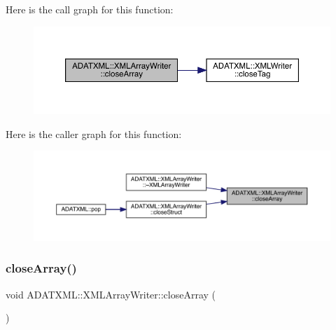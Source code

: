 Here is the call graph for this function\+:
\nopagebreak
\begin{figure}[H]
\begin{center}
\leavevmode
\includegraphics[width=350pt]{dc/df3/classADATXML_1_1XMLArrayWriter_a5d6b79a0e8add658220f21e5fc138230_cgraph}
\end{center}
\end{figure}
Here is the caller graph for this function\+:
\nopagebreak
\begin{figure}[H]
\begin{center}
\leavevmode
\includegraphics[width=350pt]{dc/df3/classADATXML_1_1XMLArrayWriter_a5d6b79a0e8add658220f21e5fc138230_icgraph}
\end{center}
\end{figure}
\mbox{\label{classADATXML_1_1XMLArrayWriter_a5d6b79a0e8add658220f21e5fc138230}} 
\subsubsection{\texorpdfstring{closeArray()}{closeArray()}\hspace{0.1cm}{\footnotesize\ttfamily [2/3]}}
{\footnotesize\ttfamily void A\+D\+A\+T\+X\+M\+L\+::\+X\+M\+L\+Array\+Writer\+::close\+Array (\begin{DoxyParamCaption}{ }\end{DoxyParamCaption})}

\mbox{\label{classADATXML_1_1XMLArrayWriter_a5d6b79a0e8add658220f21e5fc138230}} 

